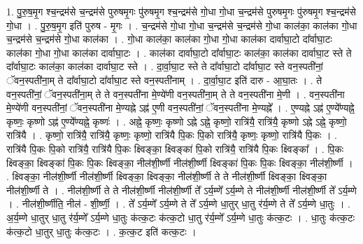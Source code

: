\documentclass[17pt]{extarticle}
\begin{document}
1. पु॒रु॒ष॒मृ॒ग श्च॒न्द्रम॑से च॒न्द्रम॑से पुरुषमृ॒गः पु॑रुषमृ॒ग श्च॒न्द्रम॑से गो॒धा गो॒धा च॒न्द्रम॑से पुरुषमृ॒गः पु॑रुषमृ॒ग श्च॒न्द्रम॑से गो॒धा । . पु॒रु॒ष॒मृ॒ग इति॑ पुरुष - मृ॒गः । . च॒न्द्रम॑से गो॒धा गो॒धा च॒न्द्रम॑से च॒न्द्रम॑से गो॒धा काल॑का॒ काल॑का गो॒धा च॒न्द्रम॑से च॒न्द्रम॑से गो॒धा काल॑का । . गो॒धा काल॑का॒ काल॑का गो॒धा गो॒धा काल॑का दार्वाघा॒टो दा᳚र्वाघा॒टः काल॑का गो॒धा गो॒धा काल॑का दार्वाघा॒टः । . काल॑का दार्वाघा॒टो दा᳚र्वाघा॒टः काल॑का॒ काल॑का दार्वाघा॒ट स्ते ते दा᳚र्वाघा॒टः काल॑का॒ काल॑का दार्वाघा॒ट स्ते । . दा॒र्वा॒घा॒ट स्ते ते दा᳚र्वाघा॒टो दा᳚र्वाघा॒ट स्ते वन॒स्पती॑नां॒ ॅवन॒स्पती॑ना॒म् ते दा᳚र्वाघा॒टो दा᳚र्वाघा॒ट स्ते वन॒स्पती॑नाम् । . दा॒र्वा॒घा॒ट इति॑ दारु - आ॒घा॒तः । . ते वन॒स्पती॑नां॒ ॅवन॒स्पती॑ना॒म् ते ते वन॒स्पती॑ना मे॒ण्ये॑णी वन॒स्पती॑ना॒म् ते ते वन॒स्पती॑ना मे॒णी । . वन॒स्पती॑ना मे॒ण्ये॑णी वन॒स्पती॑नां॒ ॅवन॒स्पती॑ना मे॒ण्यह्ने ऽह्न॑ ए॒णी वन॒स्पती॑नां॒ ॅवन॒स्पती॑ना मे॒ण्यह्ने᳚ । . ए॒ण्यह्ने ऽह्न॑ ए॒ण्ये᳚ण्यह्ने॒ कृष्णः॒ कृष्णो ऽह्न॑ ए॒ण्ये᳚ण्यह्ने॒ कृष्णः॑ । . अह्ने॒ कृष्णः॒ कृष्णो ऽह्ने ऽह्ने॒ कृष्णो॒ रात्रि॑यै॒ रात्रि॑यै॒ कृष्णो ऽह्ने ऽह्ने॒ कृष्णो॒ रात्रि॑यै । . कृष्णो॒ रात्रि॑यै॒ रात्रि॑यै॒ कृष्णः॒ कृष्णो॒ रात्रि॑यै पि॒कः पि॒को रात्रि॑यै॒ कृष्णः॒ कृष्णो॒ रात्रि॑यै पि॒कः । . रात्रि॑यै पि॒कः पि॒को रात्रि॑यै॒ रात्रि॑यै पि॒कः क्ष्विङ्का॒ क्ष्विङ्का॑ पि॒को रात्रि॑यै॒ रात्रि॑यै पि॒कः क्ष्विङ्का᳚ । . पि॒कः क्ष्विङ्का॒ क्ष्विङ्का॑ पि॒कः पि॒कः क्ष्विङ्का॒ नील॑शी॒र्ष्णी नील॑शी॒र्ष्णी क्ष्विङ्का॑ पि॒कः पि॒कः क्ष्विङ्का॒ नील॑शी॒र्ष्णी । . क्ष्विङ्का॒ नील॑शी॒र्ष्णी नील॑शी॒र्ष्णी क्ष्विङ्का॒ क्ष्विङ्का॒ नील॑शी॒र्ष्णी ते ते नील॑शी॒र्ष्णी क्ष्विङ्का॒ क्ष्विङ्का॒ नील॑शी॒र्ष्णी ते । . नील॑शी॒र्ष्णी ते ते नील॑शी॒र्ष्णी नील॑शी॒र्ष्णी ते᳚ ऽर्य॒म्णे᳚ ऽर्य॒म्णे ते नील॑शी॒र्ष्णी नील॑शी॒र्ष्णी ते᳚ ऽर्य॒म्णे । . नील॑शी॒र्ष्णीति॒ नील॑ - शी॒र्ष्णी॒ । . ते᳚ ऽर्य॒म्णे᳚ ऽर्य॒म्णे ते ते᳚ ऽर्य॒म्णे धा॒तुर् धा॒तु र॑र्य॒म्णे ते ते᳚ ऽर्य॒म्णे धा॒तुः । . अ॒र्य॒म्णे धा॒तुर् धा॒तु र॑र्य॒म्णे᳚ ऽर्य॒म्णे धा॒तुः क॑त्क॒टः क॑त्क॒टो धा॒तु र॑र्य॒म्णे᳚ ऽर्य॒म्णे धा॒तुः क॑त्क॒टः । . धा॒तुः क॑त्क॒टः क॑त्क॒टो धा॒तुर् धा॒तुः क॑त्क॒टः । . क॒त्क॒ट इति॑ कत्क॒टः । \newline
\pagebreak
{}
\end{document}
